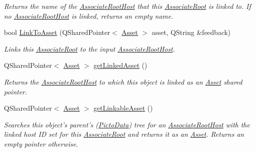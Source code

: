 \begin{DoxyCompactItemize}
\begin{DoxyCompactList}\small\item\em Returns the name of the \hyperlink{class_picto_1_1_associate_root_host}{Associate\-Root\-Host} that this \hyperlink{class_picto_1_1_associate_root}{Associate\-Root} is linked to. If no \hyperlink{class_picto_1_1_associate_root_host}{Associate\-Root\-Host} is linked, returns an empty name. \end{DoxyCompactList}\item 
bool \hyperlink{class_picto_1_1_associate_root_a80d93af8ed349ac651be22eaf556d7c8}{Link\-To\-Asset} (Q\-Shared\-Pointer$<$ \hyperlink{class_picto_1_1_asset}{Asset} $>$ asset, Q\-String \&feedback)
\begin{DoxyCompactList}\small\item\em Links this \hyperlink{class_picto_1_1_associate_root}{Associate\-Root} to the input \hyperlink{class_picto_1_1_associate_root_host}{Associate\-Root\-Host}. \end{DoxyCompactList}\item 
Q\-Shared\-Pointer$<$ \hyperlink{class_picto_1_1_asset}{Asset} $>$ \hyperlink{class_picto_1_1_associate_root_a1ed46df9a3a433c39b7ff6466cc8bc6c}{get\-Linked\-Asset} ()
\begin{DoxyCompactList}\small\item\em Returns the \hyperlink{class_picto_1_1_associate_root_host}{Associate\-Root\-Host} to which this object is linked as an \hyperlink{class_picto_1_1_asset}{Asset} shared pointer. \end{DoxyCompactList}\item 
\hypertarget{class_picto_1_1_associate_root_aca6c9178c748f6a4a4fbb83f669138fe}{Q\-Shared\-Pointer$<$ \hyperlink{class_picto_1_1_asset}{Asset} $>$ \hyperlink{class_picto_1_1_associate_root_aca6c9178c748f6a4a4fbb83f669138fe}{get\-Linkable\-Asset} ()}\label{class_picto_1_1_associate_root_aca6c9178c748f6a4a4fbb83f669138fe}

\begin{DoxyCompactList}\small\item\em Searches this object's parent's (\hyperlink{class_picto_1_1_picto_data}{Picto\-Data}) tree for an \hyperlink{class_picto_1_1_associate_root_host}{Associate\-Root\-Host} with the linked host I\-D set for this \hyperlink{class_picto_1_1_associate_root}{Associate\-Root} and returns it as an \hyperlink{class_picto_1_1_asset}{Asset}. Returns an empty pointer otherwise. \end{DoxyCompactList}\end{DoxyCompactItemize}

